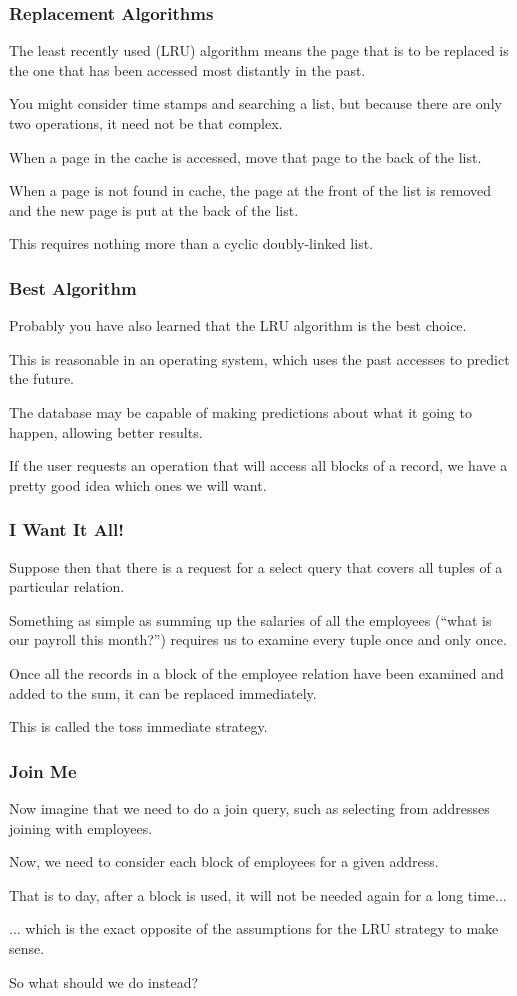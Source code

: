 \begin{frame}
\frametitle{Replacement Algorithms}

The least recently used (LRU) algorithm means the page that is to be replaced is the one that has been accessed most distantly in the past. 

You might consider time stamps and searching a list, but because there are only two operations, it need not be that complex. 

When a page in the cache is accessed, move that page to the back of the list. 

When a page is not found in cache, the page at the front of the list is removed and the new page is put at the back of the list. 

This requires nothing more than a cyclic doubly-linked list. 

\end{frame}

\begin{frame}
\frametitle{Best Algorithm}

Probably you have also learned that the LRU algorithm is the best choice. 

This is reasonable in an operating system, which uses the past accesses to predict the future. 

The database may be capable of making predictions about what it going to happen, allowing better results. 

If the user requests an operation that will access all blocks of a record, we have a pretty good idea which ones we will want.

\end{frame}

\begin{frame}
\frametitle{I Want It All!}

Suppose then that there is a request for a select query that covers all tuples of a particular relation. 

Something as simple as summing up the salaries of all the employees (``what is our payroll this month?'') requires us to examine every tuple once and only once. 

Once all the records in a block of the employee relation have been examined and added to the sum,  it can be replaced immediately. 

This is called the \alert{toss immediate} strategy.

\end{frame}

\begin{frame}
\frametitle{Join Me}

Now imagine that we need to do a join query, such as selecting from addresses joining with employees. 

Now, we need to consider each block of employees for a given address.

That is to day, after a block is used, it will not be needed again for a long time... 

... which is the exact opposite of the assumptions for the LRU strategy to make sense. 

So what should we do instead?

\end{frame}


